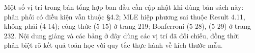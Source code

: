 Một số vị trí trong bản tổng hợp ban đầu cần cập nhật khi dùng bản sách
này: phân phối có điều kiện vẫn thuộc §4.2; MLE hiệp phương sai thuộc
Result 4.11, không phải (4-14); công thức (5-15) ở trang 219; Bonferroni
(5-28), (5-29) ở trang 232. Nội dung giảng và các bảng ở đây dùng các
vị trí đã đối chiếu, đồng thời phân biệt rõ kết quả toán học với quy tắc
thực hành về kích thước mẫu.
